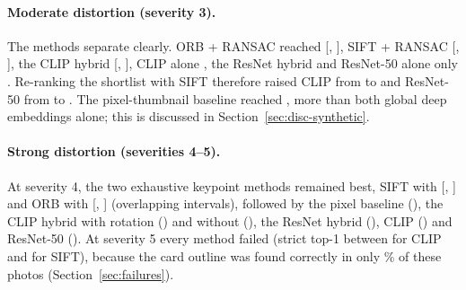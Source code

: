 \paragraph{Moderate distortion (severity 3).} The methods separate clearly. ORB + RANSAC reached  {\small[, ]}, SIFT + RANSAC  {\small[, ]}, the CLIP hybrid  {\small[, ]}, CLIP alone , the ResNet hybrid  and ResNet-50 alone only . Re-ranking the shortlist with SIFT therefore raised CLIP from  to  and ResNet-50 from  to . The pixel-thumbnail baseline reached , more than both global deep embeddings alone; this is discussed in Section~\ref{sec:disc-synthetic}.

\paragraph{Strong distortion (severities 4--5).} At severity 4, the two exhaustive keypoint methods remained best, SIFT with  {\small[, ]} and ORB with  {\small[, ]} (overlapping intervals), followed by the pixel baseline (), the CLIP hybrid with rotation () and without (), the ResNet hybrid (), CLIP () and ResNet-50 (). At severity 5 every method failed (strict top-1 between  for CLIP and  for SIFT), because the card outline was found correctly in only \% of these photos (Section~\ref{sec:failures}).

